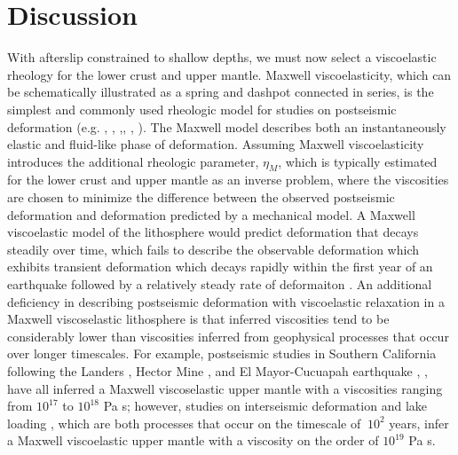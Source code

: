 \documentclass[12pt]{article}
\begin{document}
\section{Discussion}

With afterslip constrained to shallow depths, we must now select a viscoelastic rheology for the lower crust and upper mantle. Maxwell viscoelasticity, which can be schematically illustrated as a spring and dashpot connected in series, is the simplest and commonly used rheologic model for studies on postseismic deformation (e.g. \cite{Nur1974}, \cite{Pollitz2000}, \cite{Hetland2003},\cite{Freed2006a}, \cite{Johnson2009}, \cite{Hearn2009}).  The Maxwell model describes both an instantaneously elastic and fluid-like phase of deformation.   Assuming Maxwell viscoelasticity introduces the additional rheologic parameter, $\eta_M$, which is typically estimated for the lower crust and upper mantle as an inverse problem, where the viscosities are chosen to minimize the difference between the observed postseismic deformation and deformation predicted by a mechanical model. A Maxwell viscoelastic model of the lithosphere would predict deformation that decays steadily over time, which fails to describe the observable deformation which exhibits transient deformation which decays rapidly within the first year of an earthquake followed by a relatively steady rate of deformaiton \cite{Savage1997}.  An additional deficiency in describing postseismic deformation with viscoelastic relaxation in a Maxwell viscoselastic lithosphere is that inferred viscosities tend to be considerably lower than viscosities inferred from geophysical processes that occur over longer timescales. For example, postseismic studies in Southern California following the Landers \cite{Pollitz2000}, Hector Mine \cite{Pollitz2001}, and El Mayor-Cucuapah earthquake \cite{Spinler2015}, \cite{Rollins2015}, have all inferred a Maxwell viscoselastic upper mantle with a viscosities ranging from $10^{17}$ to $10^{18}$ Pa s; however, studies on interseismic deformation \cite{Lundgren2009} and lake loading \cite{Luttrell2007}, which are both processes that occur on the timescale of $~10^2$ years, infer a Maxwell viscoelastic upper mantle with a viscosity on the order of $10^{19}$ Pa s.  
\end{document}
